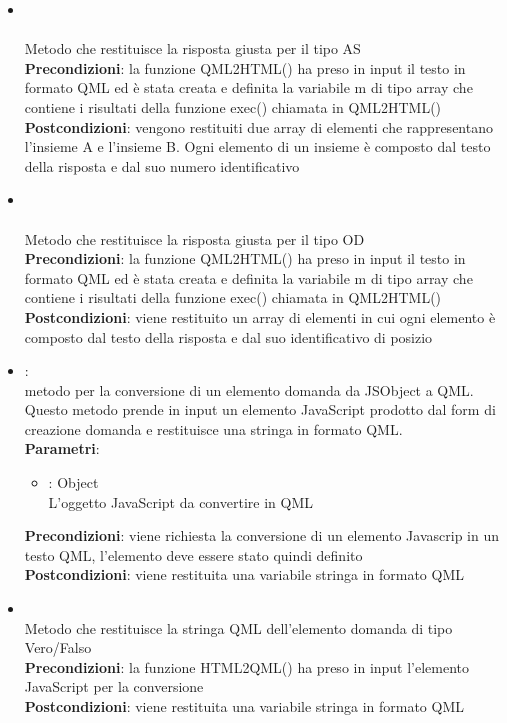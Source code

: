 \begin{itemize}
\begin{itemize}
		\item{}\\
		 \\Metodo che restituisce la risposta giusta per il tipo AS\\
		\textbf{Precondizioni}: la funzione QML2HTML() ha preso in input il testo in formato QML ed è stata creata e definita la variabile m di tipo array che contiene i risultati della funzione exec() chiamata in QML2HTML()\\
		\textbf{Postcondizioni}: vengono restituiti due array di elementi che rappresentano l'insieme A e l'insieme B. Ogni elemento di un insieme è composto dal testo della risposta e dal suo numero identificativo \\
		
		\item{}\\
		 \\Metodo che restituisce la risposta giusta per il tipo OD\\
		\textbf{Precondizioni}: la funzione QML2HTML() ha preso in input il testo in formato QML ed è stata creata e definita la variabile m di tipo array che contiene i risultati della funzione exec() chiamata in QML2HTML()\\
		\textbf{Postcondizioni}: viene restituito un array di elementi in cui ogni elemento è composto dal testo della risposta e dal suo identificativo di posizio \\
		
		\item{}:\\
		 metodo per la conversione di un elemento domanda da JSObject a QML. Questo metodo prende in input un elemento JavaScript prodotto dal form di creazione domanda e restituisce una stringa in formato QML. \\
		\textbf{Parametri}:
			\begin{itemize}
				\item{}: Object\\
				 L'oggetto JavaScript da convertire in QML \\
			\end{itemize}
		\textbf{Precondizioni}: viene richiesta la conversione di un elemento Javascrip in un testo QML, l'elemento deve essere stato quindi definito\\
		\textbf{Postcondizioni}: viene restituita una variabile stringa in formato QML\\
		\item{}\\
		 Metodo che restituisce la stringa QML dell'elemento domanda di tipo Vero/Falso\\
		\textbf{Precondizioni}: la funzione HTML2QML() ha preso in input l'elemento JavaScript per la conversione\\
		\textbf{Postcondizioni}: viene restituita una variabile stringa in formato QML\\
		

\end{itemize}
\end{itemize}
